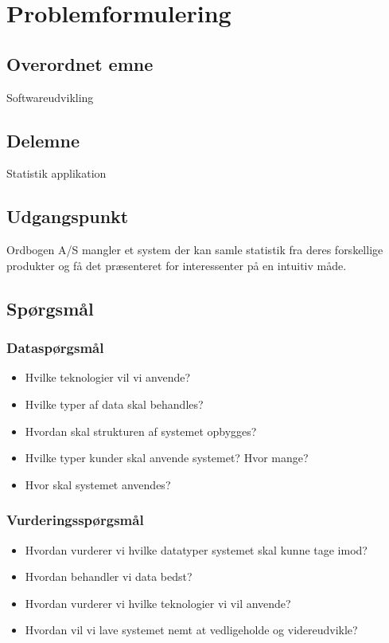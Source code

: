 \section{Problemformulering}
\subsection{Overordnet emne}
Softwareudvikling
\subsection{Delemne}
Statistik applikation
\subsection{Udgangspunkt}
Ordbogen A/S mangler et system der kan samle statistik fra deres forskellige produkter og få det præsenteret for interessenter på en intuitiv måde.
\subsection{Spørgsmål}
\subsubsection{Dataspørgsmål}
\begin{itemize}
    \item{Hvilke teknologier vil vi anvende?}
    \item{Hvilke typer af data skal behandles?}
    \item{Hvordan skal strukturen af systemet opbygges?}
    \item{Hvilke typer kunder skal anvende systemet? Hvor mange?}
    \item{Hvor skal systemet anvendes?}
\end{itemize}
\subsubsection{Vurderingsspørgsmål}
\begin{itemize}
    \item{Hvordan vurderer vi hvilke datatyper systemet skal kunne tage imod?}
    \item{Hvordan behandler vi data bedst?}
    \item{Hvordan vurderer vi hvilke teknologier vi vil anvende?}
    \item{Hvordan vil vi lave systemet nemt at vedligeholde og videreudvikle?}
\end{itemize}
